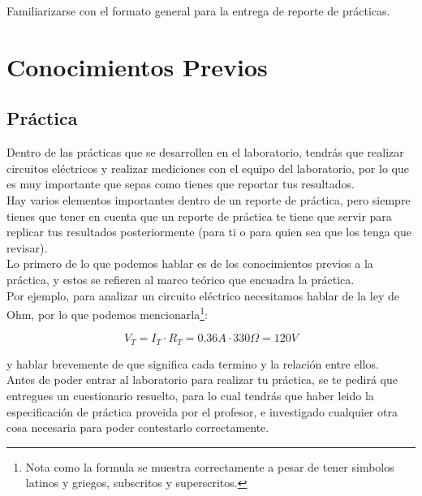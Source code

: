 	Familiarizarse con el formato general para la entrega de reporte de prácticas.


\section{Conocimientos Previos}


	\subsection{Práctica}

		Dentro de las prácticas que se desarrollen en el laboratorio, tendrás que realizar circuitos eléctricos y realizar mediciones con el equipo del laboratorio, por lo que es muy importante que sepas como tienes que reportar tus resultados. \\

		Hay varios elementos importantes dentro de un reporte de práctica, pero siempre tienes que tener en cuenta que un reporte de práctica te tiene que servir para replicar tus resultados posteriormente (para ti o para quien sea que los tenga que revisar). \\

		Lo primero de lo que podemos hablar es de los conocimientos previos a la práctica, y estos se refieren al marco teórico que encuadra la práctica. \\

		Por ejemplo, para analizar un circuito eléctrico necesitamos hablar de la ley de Ohm, por lo que podemos mencionarla\footnote{Nota como la formula se muestra correctamente a pesar de tener simbolos latinos y griegos, subscritos y superscritos.}:

		\begin{equation}
			V_T = I_T \cdot R_T = 0.36 A \cdot 330 \Omega = 120 V
		\end{equation}

		y hablar brevemente de que significa cada termino y la relación entre ellos. \\

		Antes de poder entrar al laboratorio para realizar tu práctica, se te pedirá que entregues un cuestionario resuelto, para lo cual tendrás que haber leido la especificación de práctica proveida por el profesor, e investigado cualquier otra cosa necesaria para poder contestarlo correctamente. \\

